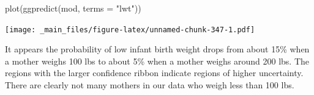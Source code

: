 \documentclass[
]{book}
\newenvironment{Shaded}{\begin{snugshade}}{\end{snugshade}}
\newcommand{\AttributeTok}[1]{\textcolor[rgb]{0.77,0.63,0.00}{#1}}
\newcommand{\FunctionTok}[1]{\textcolor[rgb]{0.00,0.00,0.00}{#1}}
\newcommand{\NormalTok}[1]{#1}
\newcommand{\StringTok}[1]{\textcolor[rgb]{0.31,0.60,0.02}{#1}}
\begin{document}
\begin{Shaded}
\begin{Highlighting}[]
\FunctionTok{plot}\NormalTok{(}\FunctionTok{ggpredict}\NormalTok{(mod, }\AttributeTok{terms =} \StringTok{"lwt"}\NormalTok{))}
\end{Highlighting}
\end{Shaded}

\texttt{[image: \_main\_files/figure-latex/unnamed-chunk-347-1.pdf]}

It appears the probability of low infant birth weight drops from about 15\% when a mother weighs 100 lbs to about 5\% when a mother weighs around 200 lbs. The regions with the larger confidence ribbon indicate regions of higher uncertainty. There are clearly not many mothers in our data who weigh less than 100 lbs.

  
\end{document}
